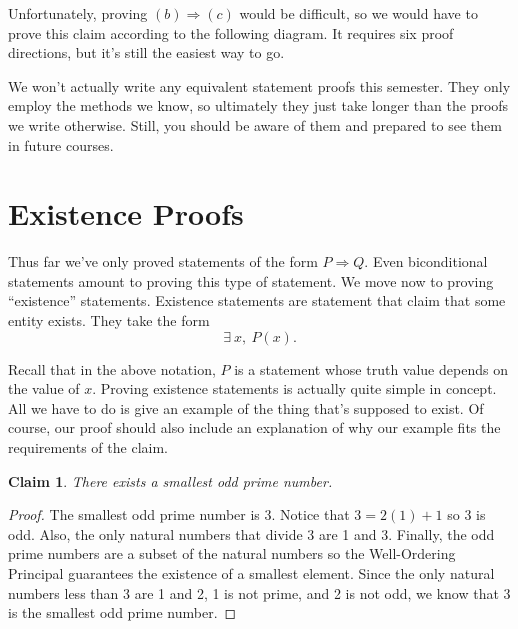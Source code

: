 \documentclass[12 pt]{article}
\theoremstyle{definition}
\theoremstyle{plain}
\theoremstyle{mytheorem}
\theoremstyle{myexample}
\newtheorem{claim}{Claim}
\theoremstyle{mydefinition}
\begin{document}
Unfortunately, proving $(b) \Rightarrow (c)$ would be difficult, so we would have to prove this claim according to the following diagram.  It requires six proof directions, but it's still the easiest way to go.

\begin{figure}[h]
\centering
{}
\end{figure}

We won't actually write any equivalent statement proofs this semester.  They only employ the methods we know, so ultimately they just take longer than the proofs we write otherwise.  Still, you should be aware of them and prepared to see them in future courses.


\section{Existence Proofs}
Thus far we've only proved statements of the form $P \Rightarrow Q$.  Even biconditional statements amount to proving this type of statement.  We move now to proving ``existence'' statements.  Existence statements are statement that claim that some entity exists.  They take the form 
\[ \exists \ x, \ P(x).\]

\noindent Recall that in the above notation, $P$ is a statement whose truth value depends on the value of $x$.  Proving existence statements is actually quite simple in concept.  All we have to do is give an example of the thing that's supposed to exist.  Of course, our proof should also include an explanation of why our example fits the requirements of the claim.

\begin{claim} There exists a smallest odd prime number.
\end{claim}
\begin{proof}  The smallest odd prime number is 3.  Notice that $3=2(1)+1$ so 3 is odd.  Also, the only natural numbers that divide 3 are 1 and 3.  Finally, the odd prime numbers are a subset of the natural numbers so the Well-Ordering Principal guarantees the existence of a smallest element.  Since the only natural numbers less than 3 are 1 and 2, 1 is not prime, and 2 is not odd, we know that 3 is the smallest odd prime number.
\end{proof}
\end{document}
